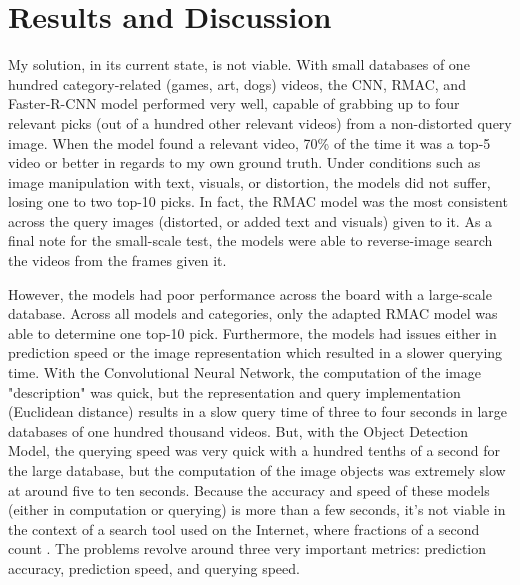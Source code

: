 \documentclass[10pt,twocolumn]{article}
\begin{document}
\section{Results and Discussion}

My solution, in its current state, is not viable. With small databases of one hundred category-related (games, art, dogs) videos, the CNN, RMAC, and Faster-R-CNN model performed very well, capable of grabbing up to four relevant picks (out of a hundred other relevant videos) from a non-distorted query image. When the model found a relevant video, 70\% of the time it was a top-5 video or better in regards to my own ground truth. Under conditions such as image manipulation with text, visuals, or distortion, the models did not suffer, losing one to two top-10 picks. In fact, the RMAC model was the most consistent across the query images (distorted, or added text and visuals) given to it. As a final note for the small-scale test, the models were able to reverse-image search the videos from the frames given it. 

However, the models had poor performance across the board with a large-scale database. Across all models and categories, only the adapted RMAC model was able to determine one top-10 pick. Furthermore, the models had issues either in prediction speed or the image representation which resulted in a slower querying time. With the Convolutional Neural Network, the computation of the image "description" was quick, but the representation and query implementation (Euclidean distance) results in a slow query time of three to four seconds in large databases of one hundred thousand videos. But, with the Object Detection Model, the querying speed was very quick with a hundred tenths of a second for the large database, but the computation of the image objects was extremely slow at around five to ten seconds. Because the accuracy and speed of these models (either in computation or querying) is more than a few seconds, it's not viable in the context of a search tool used on the Internet, where fractions of a second count \cite{GoogleSpeedGospel}. The problems revolve around three very important metrics: prediction accuracy, prediction speed, and querying speed.
\end{document}
